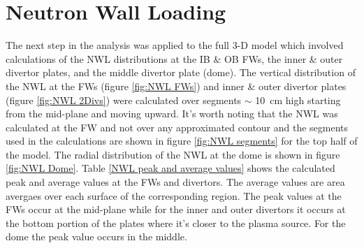 \documentclass[12pt, letterpaper]{elsarticle}
\begin{document}
\section{Neutron Wall Loading} \label{Neutron Wall Loading}
The next step in the analysis was applied to the full 3-D model which involved calculations of the NWL distributions at the IB \& OB FWs, the inner \& outer divertor plates, and the middle divertor plate (dome). The vertical distribution of the NWL at the FWs (figure \ref{fig:NWL FWs}) and inner \& outer divertor plates (figure \ref{fig:NWL 2Divs}) were calculated over segments $\sim$ \SI{10}{cm} high starting from the mid-plane and moving upward. It's worth noting that the NWL was calculated at the FW and not over any approximated contour and the segments used in the calculations are shown in figure \ref{fig:NWL segments} for the top half of the model. The radial distribution of the NWL at the dome is shown in figure \ref{fig:NWL Dome}. Table \ref{NWL peak and average values} shows the calculated peak and average values at the FWs and divertors. The average values are area avergaes over each surface of the corresponding region. The peak values at the FWs occur at the mid-plane while for the inner and outer divertors it occurs at the bottom portion of the plates where it's closer to the plasma source. For the dome the peak value occurs in the middle.  
\end{document}
